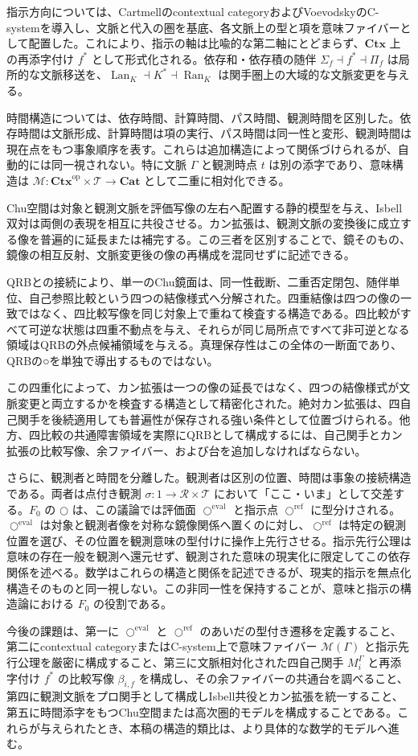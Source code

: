 \documentclass[a4paper,11pt]{ltjsarticle}
\theoremstyle{definition}
\theoremstyle{plain}
\newcommand{\CircleRef}{\bigcirc^{\mathrm{ref}}}
\newcommand{\CircleEval}{\bigcirc^{\mathrm{eval}}}
\newcommand{\Obj}{\mathcal M}
\newcommand{\Obs}{\mathcal R}
\newcommand{\Time}{\mathcal T}
\newcommand{\Lan}{\operatorname{Lan}}
\newcommand{\Ran}{\operatorname{Ran}}
\newcommand{\op}{\mathrm{op}}
\newcommand{\Ctx}{\mathbf{Ctx}}
\begin{document}
指示方向については、Cartmellのcontextual categoryおよびVoevodskyのC-systemを導入し、文脈と代入の圏を基底、各文脈上の型と項を意味ファイバーとして配置した。これにより、指示の軸は比喩的な第二軸にとどまらず、$\Ctx$ 上の再添字付け $f^*$ として形式化される。依存和・依存積の随伴 $\Sigma_f\dashv f^*\dashv\Pi_f$ は局所的な文脈移送を、$\Lan_K\dashv K^*\dashv\Ran_K$ は関手圏上の大域的な文脈変更を与える。

時間構造については、依存時間、計算時間、パス時間、観測時間を区別した。依存時間は文脈形成、計算時間は項の実行、パス時間は同一性と変形、観測時間は現在点をもつ事象順序を表す。これらは追加構造によって関係づけられるが、自動的には同一視されない。特に文脈 $\Gamma$ と観測時点 $t$ は別の添字であり、意味構造は $\Obj:\Ctx^{\op}\times\Time\to\mathbf{Cat}$ として二重に相対化できる。

Chu空間は対象と観測文脈を評価写像の左右へ配置する静的模型を与え、Isbell双対は両側の表現を相互に共役させる。カン拡張は、観測文脈の変換後に成立する像を普遍的に延長または補完する。この三者を区別することで、鏡そのもの、鏡像の相互反射、文脈変更後の像の再構成を混同せずに記述できる。

QRBとの接続により、単一のChu鏡面は、同一性截断、二重否定閉包、随伴単位、自己参照比較という四つの結像様式へ分解された。四重結像は四つの像の一致ではなく、四比較写像を同じ対象上で重ねて検査する構造である。四比較がすべて可逆な状態は四重不動点を与え、それらが同じ局所点ですべて非可逆となる領域はQRBの外点候補領域を与える。真理保存性はこの全体の一断面であり、QRBの○を単独で導出するものではない。

この四重化によって、カン拡張は一つの像の延長ではなく、四つの結像様式が文脈変更と両立するかを検査する構造として精密化された。絶対カン拡張は、四自己関手を後続適用しても普遍性が保存される強い条件として位置づけられる。他方、四比較の共通障害領域を実際にQRBとして構成するには、自己関手とカン拡張の比較写像、余ファイバー、および台を追加しなければならない。

さらに、観測者と時間を分離した。観測者は区別の位置、時間は事象の接続構造である。両者は点付き観測 $\sigma:1\to\Obs\times\Time$ において「ここ・いま」として交差する。$F_0$ の $\bigcirc$ は、この議論では評価面 $\CircleEval$ と指示点 $\CircleRef$ に型分けされる。$\CircleEval$ は対象と観測者像を対称な鏡像関係へ置くのに対し、$\CircleRef$ は特定の観測位置を選び、その位置を観測意味の型付けに操作上先行させる。指示先行公理は意味の存在一般を観測へ還元せず、観測された意味の現実化に限定してこの依存関係を述べる。数学はこれらの構造と関係を記述できるが、現実的指示を無点化構造そのものと同一視しない。この非同一性を保持することが、意味と指示の構造論における $F_0$ の役割である。

今後の課題は、第一に $\CircleEval$ と $\CircleRef$ のあいだの型付き遷移を定義すること、第二にcontextual categoryまたはC-system上で意味ファイバー $\Obj(\Gamma)$ と指示先行公理を厳密に構成すること、第三に文脈相対化された四自己関手 $M_i^{\Gamma}$ と再添字付け $f^*$ の比較写像 $\beta_{i,f}$ を構成し、その余ファイバーの共通台を調べること、第四に観測文脈をプロ関手として構成しIsbell共役とカン拡張を統一すること、第五に時間添字をもつChu空間または高次圏的モデルを構成することである。これらが与えられたとき、本稿の構造的類比は、より具体的な数学的モデルへ進む。



\end{document}
